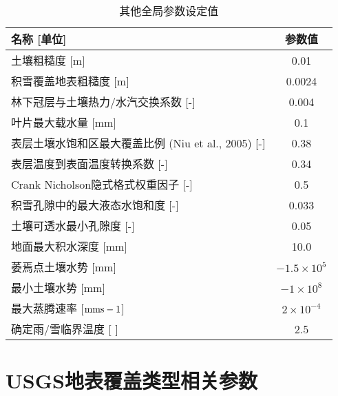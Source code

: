 \begin{table}[]
\centering
\caption{其他全局参数设定值}
\label{tab:其他全局参数设定值}
\begin{tabular}{@{}lc@{}}
\toprule
名称 {[}单位{]}                               & 参数值      \\ \midrule
土壤粗糙度 {[}m{]}                             & 0.01     \\
积雪覆盖地表粗糙度 {[}m{]}                         & 0.0024   \\
林下冠层与土壤热力/水汽交换系数 {[}-{]}                  & 0.004    \\
叶片最大载水量 {[}mm{]}                          & 0.1      \\
表层土壤水饱和区最大覆盖比例 (Niu et al., 2005) {[}-{]} & 0.38     \\
表层温度到表面温度转换系数 {[}-{]}                     & 0.34     \\
Crank Nicholson隐式格式权重因子 {[}-{]}           & 0.5      \\
积雪孔隙中的最大液态水饱和度 {[}-{]}                    & 0.033    \\
土壤可透水最小孔隙度 {[}-{]}                        & 0.05     \\
地面最大积水深度 {[}mm{]}                         & 10.0     \\
萎焉点土壤水势 {[}mm{]}                          & $-1.5\times 10^5$ \\
最小土壤水势 {[}mm{]}                           & $-1\times 10^8$   \\
最大蒸腾速率 {[}$\rm mm s-1${]}                         & $2\times 10^{-4}$   \\
确定雨/雪临界温度 {[} {]}                         & 2.5      \\ \bottomrule
\end{tabular}
\end{table}


\chapter{USGS地表覆盖类型相关参数}\label{USGS地表覆盖类型相关参数}

